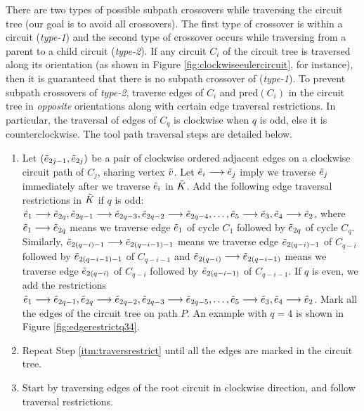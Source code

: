 There are two types of possible subpath crossovers while traversing the circuit tree (our goal is to avoid all crossovers).
The first type of crossover is within a circuit (\textit{type-1}) and the second type of crossover occurs while traversing from a parent to a child circuit (\textit{type-2}).  
If any circuit $C_i$  of the circuit tree is traversed along its orientation (as shown in Figure \ref{fig:clockwiseeulercircuit}, for instance), then it is guaranteed that there is no subpath crossover of (\textit{type-1}).
To prevent subpath crossovers of \textit{type-2}, traverse edges of $C_i$ and pred$(C_i)$ in the circuit tree in \emph{opposite} orientations along with certain edge traversal restrictions.
In particular, the traversal of edges of $C_q$ is clockwise when $q$ is odd, else it is counterclockwise.
The tool path traversal steps are detailed below.


\begin{enumerate}
  \item\label{itm:traversrestrict}
   Let $(\tilde{e}_{2j-1}, \tilde{e}_{2j})$ be a pair of clockwise ordered adjacent edges on a clockwise circuit path of $C_j$, sharing vertex $\tilde{v}$.
   Let $\tilde{e}_i \longrightarrow \tilde{e}_j$ imply we traverse $\tilde{e}_j$ immediately after we traverse $\tilde{e}_i$ in $\tilde{K}$.
   Add the following edge traversal restrictions in $\tilde{K}$ if $q$ is odd: $\tilde{e}_1 \longrightarrow \tilde{e}_{2q}, \tilde{e}_{2q-1} \longrightarrow \tilde{e}_{2q -3}, \tilde{e}_{2q-2} \longrightarrow \tilde{e}_{2q -4}, \dots,  \tilde{e}_{5} \longrightarrow \tilde{e}_{3},\tilde{e}_{4} \longrightarrow \tilde{e}_{2}$, where $\tilde{e}_1 \longrightarrow \tilde{e}_{2q}$ means we traverse edge $\tilde{e}_1$ of cycle $C_1$ followed by $\tilde{e}_{2q}$ of cycle $C_q$.
   Similarly, $\tilde{e}_{2(q-i)-1} \longrightarrow \tilde{e}_{2(q-i-1)-1}$ means we traverse edge $\tilde{e}_{2(q-i)-1}$ of $C_{q-i}$ followed by $\tilde{e}_{2(q-i-1)-1}$ of $C_{q-i-1}$ and  $\tilde{e}_{2(q-i)} \longrightarrow \tilde{e}_{2(q-i-1)}$  means we traverse edge $\tilde{e}_{2(q-i)}$ of $C_{q-i}$ followed by $\tilde{e}_{2(q-i-1)}$ of $C_{q-i-1}$.  
   If $q$ is even, we add the restrictions $\tilde{e}_1 \longrightarrow \tilde{e}_{2q -1},\tilde{e}_{2q} \longrightarrow \tilde{e}_{2q -2}, \tilde{e}_{2q-3} \longrightarrow \tilde{e}_{2q -5}, \dots, \tilde{e}_{5} \longrightarrow \tilde{e}_{3}, \tilde{e}_{4} \longrightarrow \tilde{e}_{2}$.
   Mark all the edges of the circuit tree on path $P$.
   An example with $q=4$ is shown in Figure \ref{fig:edgerestrictq34}.     

 \item Repeat Step \ref{itm:traversrestrict} until all the edges are marked in the circuit tree.
   
 \item Start by traversing edges of the root circuit in clockwise direction, and follow traversal restrictions.        
\end{enumerate}

